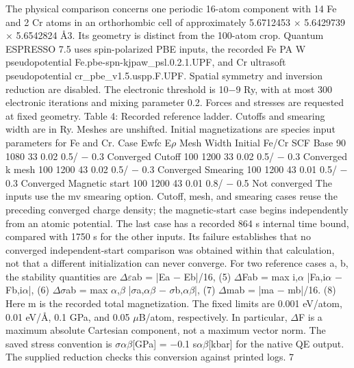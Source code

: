 \documentclass[11pt]{article}
\begin{document}
The physical comparison concerns one periodic 16-atom component with 14 Fe and 2 Cr atoms in an
orthorhombic cell of approximately 5.6712453 \ensuremath{\times} 5.6429739 \ensuremath{\times} 5.6542824 Å3. Its geometry is distinct
from the 100-atom crop. Quantum ESPRESSO 7.5 uses spin-polarized PBE inputs, the recorded
Fe PA W pseudopotential Fe.pbe-spn-kjpaw\_psl.0.2.1.UPF, and Cr ultrasoft pseudopotential
cr\_pbe\_v1.5.uspp.F.UPF. Spatial symmetry and inversion reduction are disabled. The electronic
threshold is 10\ensuremath{-}9 Ry, with at most 300 electronic iterations and mixing parameter 0.2. Forces and
stresses are requested at fixed geometry.
Table 4: Recorded reference ladder. Cutoffs and smearing width are in Ry. Meshes are unshifted.
Initial magnetizations are species input parameters for Fe and Cr.
Case Ewfc E\ensuremath{\rho} Mesh Width Initial Fe/Cr SCF
Base 90 1080 33 0.02 0.5/ \ensuremath{-} 0.3 Converged
Cutoff 100 1200 33 0.02 0.5/ \ensuremath{-} 0.3 Converged
k mesh 100 1200 43 0.02 0.5/ \ensuremath{-} 0.3 Converged
Smearing 100 1200 43 0.01 0.5/ \ensuremath{-} 0.3 Converged
Magnetic start 100 1200 43 0.01 0.8/ \ensuremath{-} 0.5 Not converged
The inputs use the mv smearing option. Cutoff, mesh, and smearing cases reuse the preceding
converged charge density; the magnetic-start case begins independently from an atomic potential.
The last case has a recorded 864 s internal time bound, compared with 1750 s for the other inputs.
Its failure establishes that no converged independent-start comparison was obtained within that
calculation, not that a different initialization can never converge.
For two reference cases a, b, the stability quantities are
\ensuremath{\Delta}\ensuremath{\varepsilon}ab = |Ea \ensuremath{-} Eb|/16, (5)
\ensuremath{\Delta}Fab = max
i,\ensuremath{\alpha}
|Fa,i\ensuremath{\alpha} \ensuremath{-} Fb,i\ensuremath{\alpha}|, (6)
\ensuremath{\Delta}\ensuremath{\sigma}ab = max
\ensuremath{\alpha},\ensuremath{\beta}
|\ensuremath{\sigma}a,\ensuremath{\alpha}\ensuremath{\beta} \ensuremath{-} \ensuremath{\sigma}b,\ensuremath{\alpha}\ensuremath{\beta}|, (7)
\ensuremath{\Delta}mab = |ma \ensuremath{-} mb|/16. (8)
Here m is the recorded total magnetization. The fixed limits are 0.001 eV/atom, 0.01 eV/Å, 0.1 GPa,
and 0.05 \ensuremath{\mu}B/atom, respectively. In particular, \ensuremath{\Delta}F is a maximum absolute Cartesian component,
not a maximum vector norm. The saved stress convention is \ensuremath{\sigma}\ensuremath{\alpha}\ensuremath{\beta}[GPa] = \ensuremath{-}0.1 s\ensuremath{\alpha}\ensuremath{\beta}[kbar] for the
native QE output. The supplied reduction checks this conversion against printed logs.
7
\end{document}
